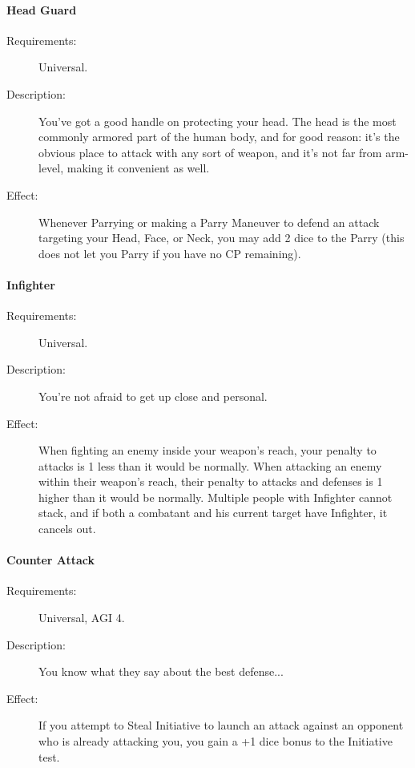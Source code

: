 \documentclass[oneside,11pt,english]{book}
\begin{document}
\paragraph{Head Guard}\label{talent:Head Guard}
\begin{description}
	\item [Requirements:] Universal. 
	\item [Description:] You’ve got a good handle on protecting your head. The head is the most commonly 
	armored part of the human body, and for good reason: it’s the obvious place to attack with any sort of 
	weapon, and it’s not far from arm-level, making it convenient as well. 
	\item [Effect:] Whenever Parrying or making a Parry Maneuver to defend an attack targeting your Head, Face, or 
	Neck, you may add 2 dice to the Parry (this does not let you Parry if you have no CP remaining). 
	
\end{description}
\paragraph{Infighter}\label{talent:Infighter}
\begin{description}
	\item [Requirements:] Universal. 
	\item [Description:] You’re not afraid to get up close and personal. 
	\item [Effect:] When fighting an enemy inside your weapon's reach, your penalty to attacks is 1 less than it would be normally. When attacking an enemy within their weapon’s reach, their penalty to attacks and 
	defenses is 1 higher than it would be normally. Multiple people with Infighter cannot stack, and if both a 
	combatant and his current target have Infighter, it cancels out. 
	
\end{description}
\paragraph{Counter Attack}\label{talent:Counter Attack}
\begin{description}
	\item [Requirements:] Universal, AGI 4. 
	\item [Description:] You know what they say about the best defense... 
	\item [Effect:] If you attempt to Steal Initiative to launch an attack against an opponent who is already attacking you, you gain a +1 dice bonus to the Initiative test.
\end{description}
\end{document}

